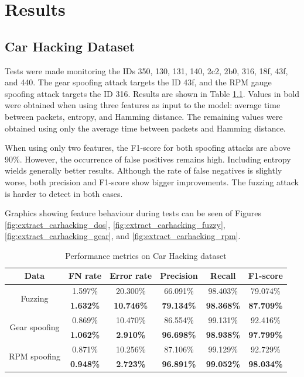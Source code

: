 \chapter{Results}
\label{c:results}

\section{Car Hacking Dataset}

Tests were made monitoring the IDs 350, 130, 131, 140, 2c2, 2b0, 316, 18f, 43f, and 440. The gear spoofing attack targets the ID 43f, and the RPM gauge spoofing attack targets the ID 316. Results are shown in Table \ref{tab:perf_car_hacking}. Values in bold were obtained when using three features as input to the model: average time between packets, entropy, and Hamming distance. The remaining values were obtained using only the average time between packets and Hamming distance.\par
When using only two features, the F1-score for both spoofing attacks are above 90\%. However, the occurrence of false positives remains high. Including entropy wields generally better results. Although the rate of false negatives is slightly worse, both precision and F1-score show bigger improvements. The fuzzing attack is harder to detect in both cases.\par
Graphics showing feature behaviour during tests can be seen of Figures \ref{fig:extract_carhacking_dos}, \ref{fig:extract_carhacking_fuzzy}, \ref{fig:extract_carhacking_gear}, and \ref{fig:extract_carhacking_rpm}.

\begin{table}
    \centering
    \begin{tabular}{*{6}{c}}
        \toprule
        \textbf{Data} & \textbf{FN rate} & \textbf{Error rate} & \textbf{Precision} & \textbf{Recall} & \textbf{F1-score}\\
        \midrule
        \multirow{2}{*}{Fuzzing} & 1.597\% & 20.300\% & 66.091\% & 98.403\% & 79.074\%\\
        & \textbf{1.632\%} & \textbf{10.746\%} & \textbf{79.134\%} & \textbf{98.368\%} & \textbf{87.709\%}\\
        \multirow{2}{*}{Gear spoofing} & 0.869\% & 10.470\% & 86.554\% & 99.131\% & 92.416\%\\
        & \textbf{1.062\%} & \textbf{2.910\%} & \textbf{96.698\%} & \textbf{98.938\%} & \textbf{97.799\%}\\
        \multirow{2}{*}{RPM spoofing} & 0.871\% & 10.256\% & 87.106\% & 99.129\% & 92.729\%\\
        & \textbf{0.948\%} & \textbf{2.723\%} & \textbf{96.891\%} & \textbf{99.052\%} & \textbf{98.034\%}\\
        \bottomrule
    \end{tabular}
    \caption{Performance metrics on Car Hacking dataset}
    \label{tab:perf_car_hacking}
\end{table}

